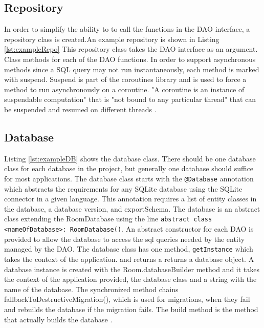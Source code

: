 \documentclass[12pt]{article}
\begin{document}
\subsection{Repository}

In order to simplify the ability to to call the functions in the DAO interface, a repository class is created.An example repository is shown in Listing \ref{lst:exampleRepo}  This repository class takes the DAO interface as an argument. Class methods for each of the DAO functions. In order to support asynchronous methods since a SQL query may not run instantaneously, each method is marked with suspend. Suspend is part of the coroutines library and is used to force a method to run asynchronously on a coroutine. "A coroutine is an instance of suspendable  computation" that is "not bound to any particular thread" that can be suspended and resumed on different threads \cite{kotlinCoroutines}. 

\subsection{Database}


Listing \ref{lst:exampleDB} shows the database class. There should be one database class for each database in the project, but generally one database should suffice for most applications. The database class starts with the \verb|@Database| annotation which abstracts the requirements for any SQLite database using the SQLite connector in a given language. This annotation requires a list of entity classes in the database, a database version, and exportSchema. The database is an abstract class extending the RoomDatabase using the line \verb|abstract class <nameOfDatabase>: RoomDatabase()|. An abstract constructor for each DAO is provided to allow the database to access the sql queries needed by the entity managed by the DAO. The database class has one method, \verb|getInstance| which takes the context of the application. and returns a returns a database object. A database instance is created with the Room.databaseBuilder method and it takes the context of the application provided, the database class and a string with the name of the database. The synchronized method chains fallbackToDestructiveMigration(), which is used for migrations, when they fail and rebuilds the database if the migration fails. The build method is the method that actually builds the database \cite{roomDBMethods}. 
\end{document}
